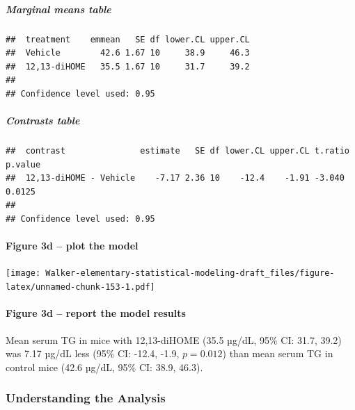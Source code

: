 \documentclass[]{book}
\let\oldparagraph\paragraph
\renewcommand{\paragraph}[1]{\oldparagraph{#1}\mbox{}}
\let\oldsubparagraph\subparagraph
\renewcommand{\subparagraph}[1]{\oldsubparagraph{#1}\mbox{}}
\begin{document}
\hypertarget{marginal-means-table}{%
\subparagraph{Marginal means table}\label{marginal-means-table}}

\begin{verbatim}
##  treatment    emmean   SE df lower.CL upper.CL
##  Vehicle        42.6 1.67 10     38.9     46.3
##  12,13-diHOME   35.5 1.67 10     31.7     39.2
## 
## Confidence level used: 0.95
\end{verbatim}

\hypertarget{contrasts-table}{%
\subparagraph{Contrasts table}\label{contrasts-table}}

\begin{verbatim}
##  contrast               estimate   SE df lower.CL upper.CL t.ratio p.value
##  12,13-diHOME - Vehicle    -7.17 2.36 10    -12.4    -1.91 -3.040  0.0125 
## 
## Confidence level used: 0.95
\end{verbatim}

\hypertarget{figure-3d-plot-the-model}{%
\paragraph{Figure 3d -- plot the model}\label{figure-3d-plot-the-model}}

\texttt{[image: Walker-elementary-statistical-modeling-draft\_files/figure-latex/unnamed-chunk-153-1.pdf]}

\hypertarget{figure-3d-report-the-model-results}{%
\paragraph{Figure 3d -- report the model results}\label{figure-3d-report-the-model-results}}

Mean serum TG in mice with 12,13-diHOME (35.5 µg/dL, 95\% CI: 31.7, 39.2) was 7.17 µg/dL less (95\% CI: -12.4, -1.9, \(p = 0.012\)) than mean serum TG in control mice (42.6 µg/dL, 95\% CI: 38.9, 46.3).

\hypertarget{understanding-the-analysis}{%
\subsubsection{Understanding the Analysis}\label{understanding-the-analysis}}
\end{document}
